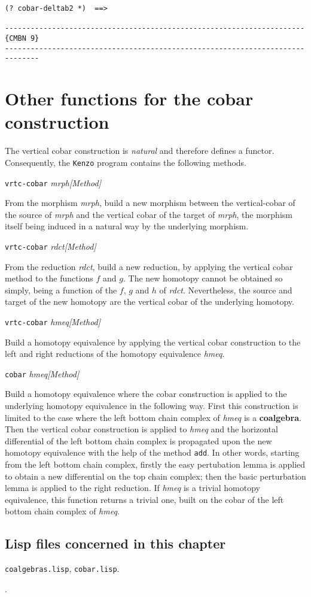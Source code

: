 {\begin{verbatim}
(? cobar-deltab2 *)  ==>

----------------------------------------------------------------------{CMBN 9}
------------------------------------------------------------------------------
\end{verbatim}}
\newpage

\section {Other functions for the cobar construction} 

The vertical cobar construction is 
{\em natural} and therefore defines a functor. 
Consequently, the {\tt Kenzo} program contains the following methods.
\vskip 0.45cm
{\parindent=0mm
{\leftskip=5mm 
{\tt vrtc-cobar} {\em mrph}\hfill {\em [Method]} \par}
{\leftskip=15mm 
From the morphism {\em mrph}, build a new morphism between the vertical-cobar of the source
of {\em mrph} and the vertical cobar of the target of {\em mrph}, the morphism itself being
induced in a natural way by the underlying morphism. \par}
{\leftskip=5mm 
{\tt vrtc-cobar} {\em rdct}\hfill {\em [Method]} \par}
{\leftskip=15mm 
From the reduction {\em rdct}, build a new reduction, by applying the vertical cobar
method to the functions $f$ and $g$. The new homotopy cannot be obtained so simply, being
a function of the $f$, $g$ and $h$ of {\em rdct}. Nevertheless, the source and target
of the new homotopy are the vertical cobar of the underlying homotopy. \par}
{\leftskip=5mm 
{\tt vrtc-cobar} {\em hmeq}\hfill {\em [Method]} \par}
{\leftskip=15mm 
Build a homotopy equivalence by applying the vertical cobar cons\-truc\-ti\-on
to the left and right reductions of the homotopy equivalence {\em hmeq}. \par}
{\leftskip=5mm 
{\tt cobar} {\em hmeq}\hfill {\em [Method]} \par}
{\leftskip=15mm 
Build a  homotopy equivalence where the cobar construction is applied to the
underlying homotopy equivalence in the following way. First this construction is limited to the 
case where the left bottom chain complex of {\em hmeq} is a {\bf coalgebra}. Then the vertical cobar
construction is applied to {\em hmeq} and the horizontal differential of the left bottom chain complex
is propagated upon the new homotopy equivalence with the help of the method {\tt add}. In other words,
starting from the left bottom chain complex, firstly the easy pertubation lemma is applied to
obtain a new differential on the top chain complex; then the basic perturbation lemma
is applied to the right reduction.
If {\em hmeq} is a
trivial homotopy equivalence, this function returns a trivial one, built on the cobar of
the left bottom chain complex of {\em hmeq}. \par}
}

\subsection* {Lisp files concerned in this chapter}

{\tt coalgebras.lisp}, {\tt cobar.lisp}.
\par
[{\tt classes.lisp}, {\tt macros.lisp}, {\tt various.lisp}].
